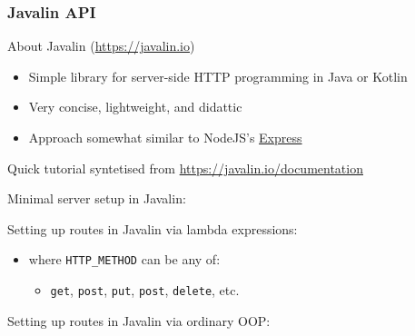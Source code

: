 \documentclass[presentation]{beamer}\mode<presentation>{\usetheme{AMSCesenaPurpleAndGold}}
\begin{document}
\begin{frame}[allowframebreaks]
    \frametitle{Javalin API}

    \begin{block}{About Javalin (\url{https://javalin.io})}
        \begin{itemize}
            \item Simple library for server-side HTTP programming in Java or Kotlin
            \item Very concise, lightweight, and \alert{didattic}
            \item Approach somewhat similar to NodeJS's \href{https://expressjs.com/it/}{Express}
        \end{itemize}
    \end{block}

    \begin{alertblock}{Quick tutorial syntetised from}
        \url{https://javalin.io/documentation}
    \end{alertblock}

    \framebreak

    Minimal server setup in Javalin:
    

    \framebreak

    Setting up routes in Javalin via lambda expressions:
    

    \begin{itemize}
        \item where \texttt{HTTP\_METHOD} can be any of:
        \begin{itemize}
            \item[] \texttt{get}, \texttt{post}, \texttt{put}, \texttt{post}, \texttt{delete}, etc.
        \end{itemize}
    \end{itemize}

    \framebreak

    Setting up routes in Javalin via ordinary OOP:
    

    \framebreak


\end{frame}
\end{document}

